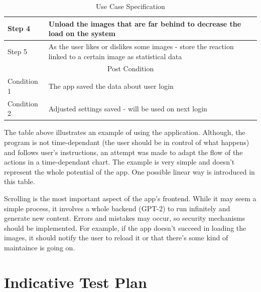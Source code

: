 \documentclass[12pt]{report}
\begin{document}
\begin{table}[h]
{\begin{tabular}{|lllll|}
                \multicolumn{1}{|l|}{Step 4}         & \multicolumn{4}{l|}{Unload the images that are far behind to decrease the load on the system}                                           \\ \hline
                \multicolumn{1}{|l|}{Step 5}         & \multicolumn{4}{l|}{As the user likes or dislikes some images - store the reaction linked to a certain image as statistical data}       \\ \hline
                \multicolumn{5}{|c|}{Post Condition}                                                                                                                                           \\ \hline
                \multicolumn{1}{|l|}{Condition 1}    & \multicolumn{4}{l|}{The app saved the data about user login}                                                                            \\ \hline
                \multicolumn{1}{|l|}{Condition 2}    & \multicolumn{4}{l|}{Adjusted settings saved - will be used on next login}                                                               \\ \hline
            \end{tabular}%
        }
        \caption{Use Case Specification}
    \end{table}

    The table above illustrates an example of using the application. Although, the program is not time-dependant (the user should be in control of what happens) and follows user's instructions, an attempt was made to adapt the flow of the actions in a time-dependant chart.
    The example is very simple and doesn't represent the whole potential of the app. One possible linear way is introduced in this table.

    Scrolling is the most important aspect of the app's frontend. While it may seem a simple process, it involves a whole backend (GPT-2) to run infinitely and generate new content. Errors and mistakes may occur, so security mechanisms should be implemented. For example, if the app doesn't succeed in loading the images,
    it should notify the user to reload it or that there's some kind of maintaince is going on.



    \section*{Indicative Test Plan}
    
\end{document}

